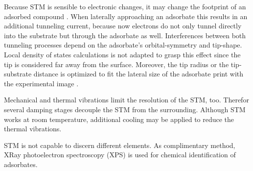 Because STM is sensible to electronic changes, it may change the footprint of an adsorbed compound \cite{sautet_interpretation_1992}. When laterally approaching an adsorbate this results in an additional tunneling current, because now electrons do not only tunnel directly into the substrate but through the adsorbate as well. Interferences between both tunneling processes depend on the adsorbate's orbital-symmetry and tip-shape. Local density of states calculations \cite{tersoff_theory_1985, lang_theory_1986, eigler_imaging_1991} is not adapted to grasp this effect since the tip is considered far away from the surface. Moreover, the tip radius or the tip-substrate distance is optimized to fit the lateral size of the adsorbate print with the experimental image \cite{tersoff_theory_1985, eigler_imaging_1991}.

Mechanical and thermal vibrations limit the resolution of the STM, too. Therefor several damping stages decouple the STM from the surrounding. Although STM works at room temperature, additional cooling may be applied to reduce the thermal vibrations.

STM is not capable to discern different elements. As complimentary method, XRay photoelectron spectroscopy (XPS) is used for chemical identification of adsorbates.